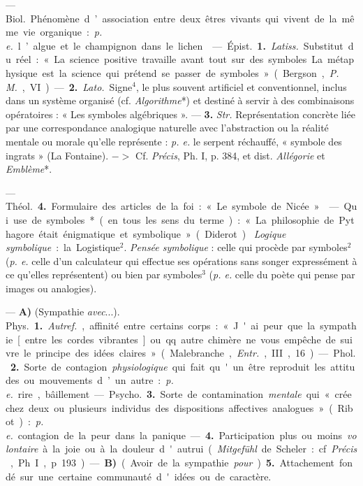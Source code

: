 \begin{itemize}[leftmargin=1cm, label=, itemsep=1pt]
 — \si{Biol.} Phénomène d’association entre deux êtres vivants
qui vivent de la même vie organique : {\it p. e.} l’algue et le champignon
dans le lichen.

 — \si{Épist.} {\bf 1.} {\it Latiss.} Substitut du réel : « La
science positive travaille avant tout sur des symboles... La métaphysique
est la science qui prétend se passer de symboles » (Bergson, {\it P. M.},
VI). — {\bf 2.} {\it Lato.} Signe$^4$, le plus souvent artificiel et
conventionnel, inclus dans un système organisé (cf. {\it Algorithme}*) et
destiné à servir à des combinaisons opératoires : « Les symboles algébriques
». — {\bf 3.} {\it Str.} Représentation concrète liée par une correspondance
analogique naturelle avec l’abstraction ou la réalité mentale ou morale
qu’elle représente : {\it p. e.} le serpent réchauffé, « symbole des ingrats
» (La Fontaine). $->$ Cf. {\it Précis}, Ph. I, p. 384, et dist. {\it
Allégorie} et {\it Emblème}*.

— \si{Théol.} {\bf 4.} Formulaire des articles de la foi : « Le symbole de
Nicée ».

 — Qui use de symboles* (en tous les sens du terme) : « La
philosophie de Pythagore était énigmatique et symbolique » (Diderot). {\it
Logique symbolique} : la Logistique$^2$. {\it Pensée symbolique} : celle qui
procède par symboles$^2$ ({\it p. e.} celle d’un calculateur
qui effectue ses opérations sans songer expressément à ce qu’elles
représentent) ou bien par symboles$^3$ ({\it p. e.} celle du poète qui pense
par images ou analogies).

 — {\bf A)} (Sympathie {\it avec}...). \si{Phys.} {\bf 1.}
{\it Autref.}, affinité entre certains corps : « J'ai peur que la sympathie
[entre les cordes vibrantes] ou qq. autre chimère ne vous empêche de suivre
le principe des idées claires » (Malebranche, {\it Entr.}, III, 16). —
\si{Phol.} {\bf 2.} Sorte de contagion {\it physiologique} qui fait qu'un
être reproduit les attitudes ou mouvements d’un autre : {\it p. e.} rire,
bâillement. — \si{Psycho.} {\bf 3.} Sorte de contamination {\it mentale} qui
« crée chez deux ou plusieurs individus des dispositions affectives
analogues » (Ribot) : {\it p. e.} contagion de la peur dans la panique. —
{\bf 4.} Participation plus ou moins {\it volontaire} à la joie ou à la
douleur d'autrui ({\it Mitgefühl} de Scheler : cf. {\it Précis}, Ph. I, p.
193).

— {\bf B)} (Avoir de la sympathie {\it pour}...). {\bf 5.} Attachement fondé sur
une certaine communauté d'idées ou de caractère.


\end{itemize}
